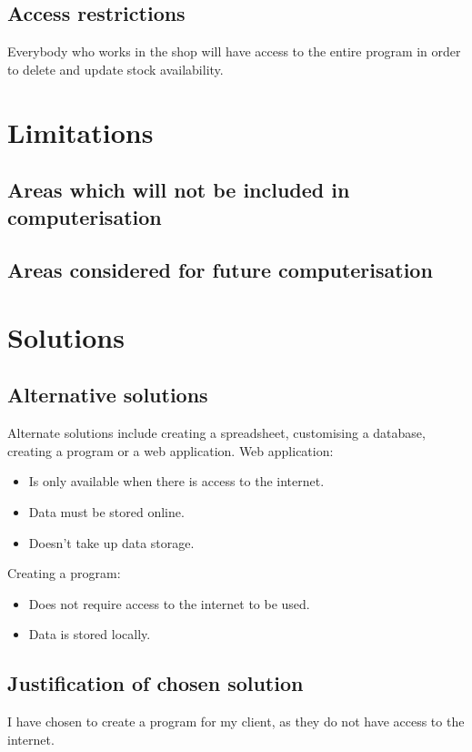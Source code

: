 \subsection{Access restrictions}
Everybody who works in the shop will have access to the entire program in order to delete and update stock availability. 
\section{Limitations}

\subsection{Areas which will not be included in computerisation}

\subsection{Areas considered for future computerisation}

\section{Solutions}

\subsection{Alternative solutions}
Alternate solutions include creating a spreadsheet, customising a database, creating a program or a web application.
Web application:
\begin{itemize}
	\item Is only available when there is access to the internet.
	\item Data must be stored online.
	\item Doesn't take up data storage.
\end{itemize}

Creating a program:
\begin{itemize}
	\item Does not require access to the internet to be used.
	\item Data is stored locally.
\end{itemize}
\subsection{Justification of chosen solution}
I have chosen to create a program for my client, as they do not have access to the internet.